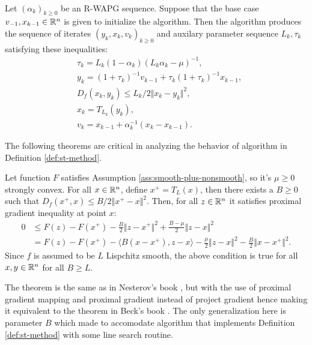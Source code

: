 \documentclass[12pt]{article}
\begin{document}
        \begin{definition}\;\label{def:st-method}\\
            Let $(\alpha_k)_{k \ge 0}$ be an R-WAPG sequence. 
            Suppose that the base case $v_{-1}, x_{k - 1}\in \mathbb R^n$ is given to initialize the algorithm. 
            Then the algorithm produces the sequence of iterates $(y_k, x_k, v_k)_{k \ge 0}$ and auxilary parameter sequence $L_k, \tau_k$ satisfying these inequalities: 
            \begin{align*}
                & \tau_k = L_k(1 - \alpha_k)(L_k\alpha_k - \mu)^{-1}, 
                \\
                & y_k = (1 + \tau_k)^{-1} v_{k - 1} + \tau_k (1 + \tau_k)^{-1} x_{k - 1},
                \\
                & D_f(x_k, y_k) \le L_k/2\Vert x_k - y_k\Vert^2, 
                \\
                & x_k = T_{L_k}(y_k),
                \\
                & v_k = x_{k - 1} + \alpha_k^{-1}(x_k - x_{k - 1}). 
            \end{align*} 
        \end{definition}
        The following theorems are critical in analyzing the behavior of algorithm in Definition \ref{def:st-method}. 
        \begin{theorem}\label{thm:pg-ineq}
            Let function $F$ satisfies Assumption \ref{ass:smooth-plus-nonsmooth}, so it's $\mu \ge 0$ strongly convex. 
            For all $x\in \mathbb R^n$, define $x^+ = T_L(x)$, then there exists a $B \ge 0$ such that $D_f(x^+, x) \le B/2 \Vert x^+ - x\Vert^2$. 
            Then, for all $z \in \mathbb R^n$ it satisfies proximal gradient inequality at point $x$:  
            \begin{align*}
                0&\le F(z) - F(x^+) - \frac{B}{2}\Vert z - x^+\Vert^2  + \frac{B - \mu}{2}\Vert z - x\Vert^2
                \\
                &=  F(z) - F(x^+) - \langle B(x - x^+), z - x\rangle
                - \frac{\mu}{2}\Vert z - x\Vert^2
                - \frac{B}{2}\Vert x - x^+\Vert^2. 
            \end{align*}
            Since $f$ is assumed to be $L$ Lispchitz smooth, the above condition is true for all $x, y \in \mathbb R^n$ for all $B \ge L$. 
        \end{theorem}
        \begin{remark}
            The theorem is the same as in Nesterov's book \cite[Theorem 2.2.13]{nesterov_lectures_2018}, but with the use of proximal gradient mapping and proximal gradient instead of project gradient hence making it equivalent to the theorem in Beck's book \cite[Theorem 10.16]{beck_first-order_2017}. 
            The only generalization here is parameter $B$ which made to accomodate algorithm that implements Definition \ref{def:st-method} with some line search routine. 
        \end{remark}
\end{document}
